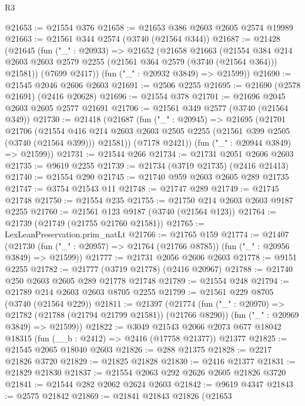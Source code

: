 \begin{lexlean}{R3}
\begin{coremodule}
@21653 := @21554 @376
@21658 := @21653 @386 @2603 @2605 @2574 @19989
@21663 := @21561 @344 @2574 (@3740 (@21564 @344))
@21687 := @21428
    (@21645
      (fun ("_" : @20933) =>
      @21652
        (@21658
          @21663
          (@21554
            @384
            @214
            @2603
            @2603
            @2579
            @2255
            (@21561 @364 @2579 (@3740 (@21564 @364)))
            @21581))
        (@7699 @2417))
      (fun ("_" : @20932 @3849) => @21599))
@21690 := @21545 @2046 @2606 @2603
@21691 := @2506 @2255
@21695 := @21690 (@2578 @21691) (@2416 @20628)
@21696 := @21554 @378
@21701 := @21696 @2045 @2603 @2605 @2577 @21691
@21706 := @21561 @349 @2577 (@3740 (@21564 @349))
@21730 := @21418
    (@21687
      (fun ("_" : @20945) =>
      @21695
        (@21701
          @21706
          (@21554
            @416
            @214
            @2603
            @2603
            @2505
            @2255
            (@21561 @399 @2505 (@3740 (@21564 @399)))
            @21581))
        (@7178 @2421))
      (fun ("_" : @20944 @3849) => @21599))
@21731 := @21544 @266
@21734 := @21731 @2051 @2606 @2603
@21735 := @9619 @2255
@21739 := @21734 (@3719 @21735) (@2416 @21413)
@21740 := @21554 @290
@21745 := @21740 @959 @2603 @2605 @289 @21735
@21747 := @3754 @21543 @11
@21748 := @21747 @289
@21749 := @21745 @21748
@21750 := @21554 @235
@21755 := @21750 @214 @2603 @2603 @9187 @2255
@21760 := @21561 @123 @9187 (@3740 (@21564 @123))
@21764 := @21739 (@21749 (@21755 @21760 @21581))
@21765 := LexLeanPreservation.prim_natLt
@21766 := @21765 @159
@21774 := @21407
    (@21730 (fun ("_" : @20957) => @21764 (@21766 @8785)) (fun ("_" : @20956 @3849) => @21599))
@21777 := @21731 @2056 @2606 @2603
@21778 := @9151 @2255
@21782 := @21777 (@3719 @21778) (@2416 @20967)
@21788 := @21740 @250 @2603 @2605 @289 @21778 @21748
@21789 := @21554 @248
@21794 := @21789 @214 @2603 @2603 @8705 @2255
@21799 := @21561 @229 @8705 (@3740 (@21564 @229))
@21811 := @21397
    (@21774
      (fun ("_" : @20970) => @21782 (@21788 (@21794 @21799 @21581)) (@21766 @8290))
      (fun ("_" : @20969 @3849) => @21599))
@21822 := @3049
    @21543
    @2066
    @2073
    @677
    @18042
    @18315
    (fun (__b : @2412) => @2416 (@17758 @21377))
    @21377
@21825 := @21545 @2065 @18040 @2603
@21826 := @288 @21375
@21828 := @2217 @21826 @3720
@21829 := @21825 @21828
@21830 := @2416 @21377
@21831 := @21829 @21830
@21837 := @21554 @2063 @292 @2626 @2605 @21826 @3720
@21841 := @21544 @282 @2062 @2624 @2603
@21842 := @9619 @4347
@21843 := @2575 @21842
@21869 := @21841
    @21843
    @21826
    (@21653

\end{coremodule}
\end{lexlean}
